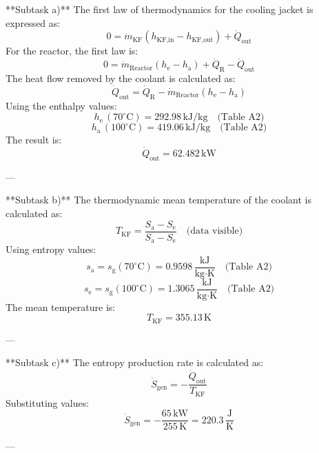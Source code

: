 **Subtask a)**  
The first law of thermodynamics for the cooling jacket is expressed as:  
\[
0 = \dot{m}_{\text{KF}} \left( h_{\text{KF,in}} - h_{\text{KF,out}} \right) + \dot{Q}_{\text{out}}
\]  
For the reactor, the first law is:  
\[
0 = \dot{m}_{\text{Reactor}} \left( h_{\text{e}} - h_{\text{a}} \right) + \dot{Q}_{\text{R}} - \dot{Q}_{\text{out}}
\]  
The heat flow removed by the coolant is calculated as:  
\[
\dot{Q}_{\text{out}} = \dot{Q}_{\text{R}} - \dot{m}_{\text{Reactor}} \left( h_{\text{e}} - h_{\text{a}} \right)
\]  
Using the enthalpy values:  
\[
h_{\text{e}} \, (70^\circ\text{C}) = 292.98 \, \text{kJ/kg} \quad \text{(Table A2)}
\]  
\[
h_{\text{a}} \, (100^\circ\text{C}) = 419.06 \, \text{kJ/kg} \quad \text{(Table A2)}
\]  
The result is:  
\[
\dot{Q}_{\text{out}} = 62.482 \, \text{kW}
\]  

---

**Subtask b)**  
The thermodynamic mean temperature of the coolant is calculated as:  
\[
T_{\text{KF}} = \frac{S_{\text{a}} - S_{\text{e}}}{S_{\text{a}} - S_{\text{e}}} \quad \text{(data visible)}
\]  
Using entropy values:  
\[
s_{\text{a}} = s_{\text{g}}(70^\circ\text{C}) = 0.9598 \, \frac{\text{kJ}}{\text{kg·K}} \quad \text{(Table A2)}
\]  
\[
s_{\text{e}} = s_{\text{g}}(100^\circ\text{C}) = 1.3065 \, \frac{\text{kJ}}{\text{kg·K}} \quad \text{(Table A2)}
\]  
The mean temperature is:  
\[
T_{\text{KF}} = 355.13 \, \text{K}
\]  

---

**Subtask c)**  
The entropy production rate is calculated as:  
\[
\dot{S}_{\text{gen}} = -\frac{\dot{Q}_{\text{out}}}{T_{\text{KF}}}
\]  
Substituting values:  
\[
\dot{S}_{\text{gen}} = -\frac{65 \, \text{kW}}{255 \, \text{K}} = 220.3 \, \frac{\text{J}}{\text{K}}
\]  

---
